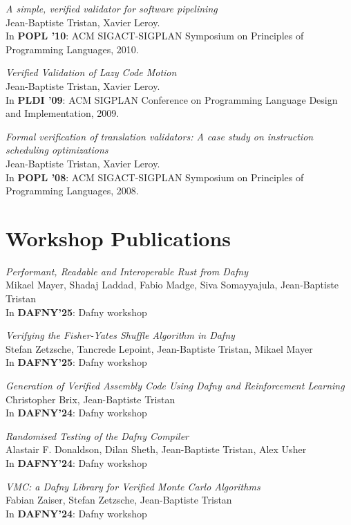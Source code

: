 \documentclass[margin,line]{res}
\begin{document}
\begin{resume}
\emph{A simple, verified validator for software pipelining}\\
Jean-Baptiste Tristan, Xavier Leroy.\\
In {\bf POPL '10}: ACM SIGACT-SIGPLAN Symposium on
Principles of Programming Languages, 2010.

\emph{Verified Validation of Lazy Code Motion}\\
Jean-Baptiste Tristan, Xavier Leroy.\\
In {\bf PLDI '09}: ACM SIGPLAN Conference on Programming
Language Design and Implementation, 2009. 

\emph{Formal verification of translation validators: A case study on instruction scheduling optimizations}\\
Jean-Baptiste Tristan, Xavier Leroy.\\
In {\bf POPL '08}: ACM SIGACT-SIGPLAN Symposium on
Principles of Programming Languages, 2008.

\section{\sc Workshop Publications}

\emph{Performant, Readable and Interoperable Rust from Dafny}\\
Mikael Mayer, Shadaj Laddad, Fabio Madge, Siva Somayyajula, Jean-Baptiste Tristan\\
In {\bf DAFNY'25}: Dafny workshop 

\emph{Verifying the Fisher-Yates Shuffle Algorithm in Dafny}\\
Stefan Zetzsche, Tancrede Lepoint, Jean-Baptiste Tristan, Mikael Mayer\\
In {\bf DAFNY'25}: Dafny workshop 

\emph{Generation of Verified Assembly Code Using Dafny and Reinforcement Learning}\\
Christopher Brix, Jean-Baptiste Tristan\\
In {\bf DAFNY'24}: Dafny workshop 

\emph{Randomised Testing of the Dafny Compiler}\\
Alastair F. Donaldson, Dilan Sheth, Jean-Baptiste Tristan, Alex Usher\\
In {\bf DAFNY'24}: Dafny workshop 

\emph{VMC: a Dafny Library for Verified Monte Carlo Algorithms}\\
Fabian Zaiser, Stefan Zetzsche, Jean-Baptiste Tristan\\
In {\bf DAFNY'24}: Dafny workshop 


\end{resume}
\end{document}
